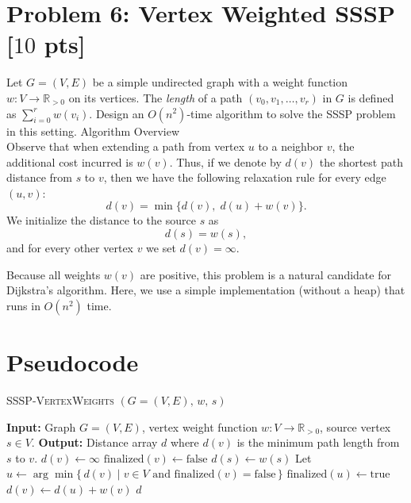 \documentclass[letterpaper, 11pt]{article}
\newcommand{\1}{\mathds{1}}	%
\theoremstyle{definition}
\newcommand{\problem}[1]{\section*{Problem #1}}
\newenvironment{solution}{{\par\noindent\it Solution.}}{}
\begin{document}
\problem{6: Vertex Weighted SSSP [$10$ pts]}
Let $G = (V,E)$ be a simple undirected graph with a weight function $w: V \rightarrow \mathbb{R}_{> 0}$ on its vertices.
The \textit{length} of a path $(v_0,v_1,\dots,v_r)$ in $G$ is defined as $\sum_{i=0}^r w(v_i)$.
Design an $O(n^2)$-time algorithm to solve the SSSP problem in this setting.
\begin{solution}
Algorithm Overview\\
Observe that when extending a path from vertex \(u\) to a neighbor \(v\), the additional cost incurred is \(w(v)\). Thus, if we denote by \(d(v)\) the shortest path distance from \(s\) to \(v\), then we have the following relaxation rule for every edge \((u,v)\):
\[
d(v) = \min\{ d(v), \; d(u) + w(v) \}.
\]
We initialize the distance to the source \(s\) as
\[
d(s) = w(s),
\]
and for every other vertex \(v\) we set \(d(v) = \infty\).

Because all weights \(w(v)\) are positive, this problem is a natural candidate for Dijkstra's algorithm. Here, we use a simple implementation (without a heap) that runs in \(O(n^2)\) time.

\section*{Pseudocode}

\begin{algorithm}[H]
\caption{\textsc{SSSP-VertexWeights} \((G=(V,E),\,w,\,s)\)}
\begin{algorithmic}[1]
\State \textbf{Input:} Graph \(G=(V,E)\), vertex weight function \(w: V \to \mathbb{R}_{> 0}\), source vertex \(s\in V\).
\State \textbf{Output:} Distance array \(d\) where \(d(v)\) is the minimum path length from \(s\) to \(v\).
    \State \(d(v) \gets \infty\)
    \State \(\text{finalized}(v) \gets \text{false}\)
\EndFor
\State \(d(s) \gets w(s)\)
    \State Let \(u \gets \arg\min \{\, d(v) \mid v\in V \text{ and } \text{finalized}(v)=\text{false}\,\}\)
    \State \(\text{finalized}(u) \gets \text{true}\)
              \State \(d(v) \gets d(u) + w(v)\)
         \EndIf
    \EndFor
\EndWhile
\State \Return \(d\)
\end{algorithmic}
\end{algorithm}


\end{solution}
\end{document}
